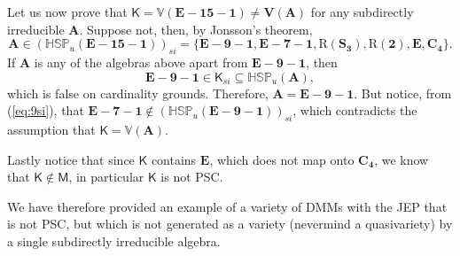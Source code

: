 \documentclass[11pt]{amsart}
\begin{document}
Let us now prove that $\mathsf{K} = \mathbb{V}(\mathbf{E-15-1}) \neq \mathbf{V}(\mathbf{A})$ for any subdirectly irreducible $\mathbf{A}$. Suppose not, then, by Jonsson's theorem,
$$\mathbf{A} \in (\mathbb{HSP}_u(\mathbf{E-15-1}))_{si} = \{\mathbf{E-9-1}, \mathbf{E-7-1}, \text{R}(\mathbf{S_3}),\text{R}(\mathbf{2}),\mathbf{E},\mathbf{C_4}\}.$$
If $\mathbf{A}$ is any of the algebras above apart from $\mathbf{E-9-1}$, then
$$\mathbf{E-9-1} \in \mathsf{K}_{si} \subseteq \mathbb{HSP}_u(\mathbf{A}),$$
which is false on cardinality grounds. Therefore, $\mathbf{A} = \mathbf{E-9-1}$. But notice, from (\ref{eq:9si}), that $\mathbf{E-7-1} \notin (\mathbb{HSP}_u(\mathbf{E-9-1}))_{si}$, which contradicts the assumption that $\mathsf{K} = \mathbb{V}(\mathbf{A})$.

Lastly notice that since $\mathsf{K}$ contains $\mathbf{E}$, which does not map onto $\mathbf{C_4}$, we know that $\mathsf{K} \notin \mathsf{M}$, in particular $\mathsf{K}$ is not PSC.

We have therefore provided an example of a variety of DMMs with the JEP that is not PSC, but which is not generated as a variety (nevermind a quasivariety) by a single subdirectly irreducible algebra.
\end{document}
